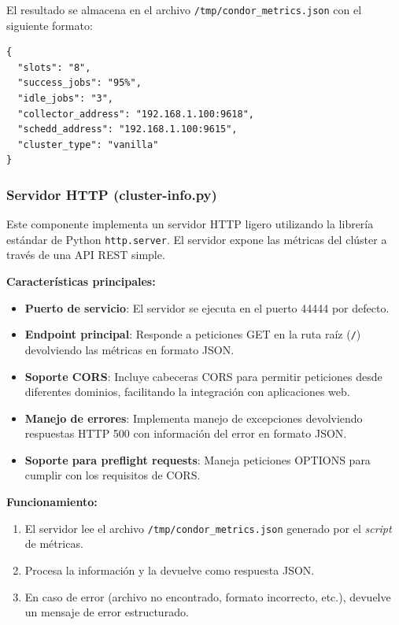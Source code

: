 El resultado se almacena en el archivo \texttt{/tmp/condor\_metrics.json} con el siguiente formato:

\begin{verbatim}
{
  "slots": "8",
  "success_jobs": "95%",
  "idle_jobs": "3",
  "collector_address": "192.168.1.100:9618",
  "schedd_address": "192.168.1.100:9615",
  "cluster_type": "vanilla"
}
\end{verbatim}

\subsubsection{Servidor HTTP (cluster-info.py)}
\noindent

Este componente implementa un servidor HTTP ligero utilizando la librería estándar de Python \texttt{http.server}. El servidor expone las métricas del clúster a través de una API REST simple.

\textbf{Características principales:}

\begin{itemize}
	\item \textbf{Puerto de servicio}: El servidor se ejecuta en el puerto 44444 por defecto.
	
	\item \textbf{Endpoint principal}: Responde a peticiones GET en la ruta raíz (\texttt{/}) devolviendo las métricas en formato JSON.
	
	\item \textbf{Soporte CORS}: Incluye cabeceras CORS para permitir peticiones desde diferentes dominios, facilitando la integración con aplicaciones web.
	
	\item \textbf{Manejo de errores}: Implementa manejo de excepciones devolviendo respuestas HTTP 500 con información del error en formato JSON.
	
	\item \textbf{Soporte para preflight requests}: Maneja peticiones OPTIONS para cumplir con los requisitos de CORS.
\end{itemize}

\textbf{Funcionamiento:}

\begin{enumerate}
	\item El servidor lee el archivo \texttt{/tmp/condor\_metrics.json} generado por el \textit{script} de métricas.
	\item Procesa la información y la devuelve como respuesta JSON.
	\item En caso de error (archivo no encontrado, formato incorrecto, etc.), devuelve un mensaje de error estructurado.
\end{enumerate}

